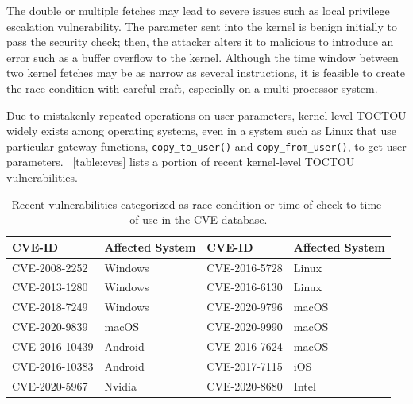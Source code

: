 The double or multiple fetches may lead to severe issues such as local privilege escalation vulnerability. The parameter sent into the kernel is benign initially to pass the security check; then, the attacker alters it to malicious to introduce an error such as a buffer overflow to the kernel. Although the time window between two kernel fetches may be as narrow as several instructions, it is feasible to create the race condition with careful craft, especially on a multi-processor system.


Due to mistakenly repeated operations on user parameters, kernel-level TOCTOU widely exists among operating systems, even in a system such as Linux that use particular gateway functions, \texttt{copy\_to\_user()} and \texttt{copy\_from\_user()}, to get user parameters. ~\autoref{table:cves} lists a portion of recent kernel-level TOCTOU vulnerabilities.


\begin{center}
\begin{table}[ht]
\small
\caption{Recent vulnerabilities categorized as race condition or time-of-check-to-time-of-use in the CVE database.}
\label{table:cves}
\centering
	\begin{tabular}{@{}>{\raggedright\arraybackslash}m{2.35cm}@{}|
			@{}>{\centering\arraybackslash}m{1.35cm}@{}|
			@{}>{\centering\arraybackslash}m{2.35cm}@{}|
			@{}>{\centering\arraybackslash}m{1.25cm}@{} } 
\hline
CVE-ID & Affected System & CVE-ID & Affected System \\ %
\hline
CVE-2008-2252  & Windows & CVE-2016-5728 & Linux \\
CVE-2013-1280  & Windows & CVE-2016-6130 & Linux \\
CVE-2018-7249  & Windows & CVE-2020-9796 & macOS \\ 
CVE-2020-9839  & macOS   & CVE-2020-9990 & macOS \\
CVE-2016-10439 & Android & CVE-2016-7624 & macOS \\
CVE-2016-10383 & Android & CVE-2017-7115 & iOS \\

CVE-2020-5967  & Nvidia  & CVE-2020-8680 & Intel \\
\hline

\end{tabular}
\end{table}
\end{center}





